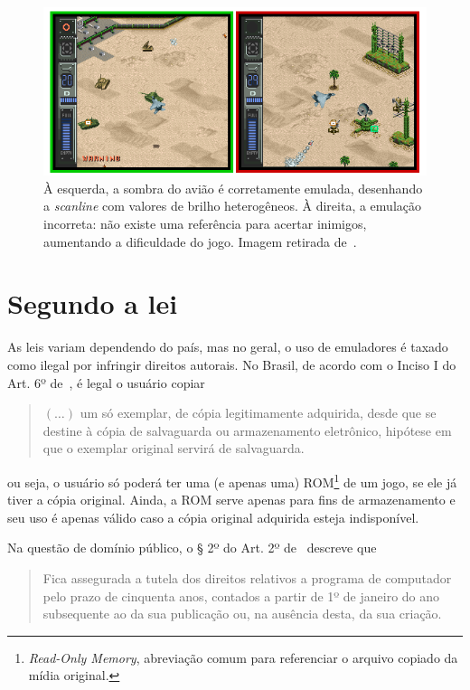 \documentclass[12pt]{sftex/sftex}
\begin{document}
\begin{figure}[ht]
\centering
\includegraphics[scale=0.70]{images/airforce}
\caption{À esquerda, a sombra do avião é corretamente emulada, desenhando a
\emph{scanline} com valores de brilho heterogêneos. À direita, a emulação
incorreta: não existe uma referência para acertar inimigos, aumentando a
dificuldade do jogo. Imagem retirada de~\cite{accpower}.}
\end{figure}

\section{Segundo a lei}

As leis variam dependendo do país, mas no geral, o uso de emuladores é taxado
como ilegal por infringir direitos autorais.  No Brasil, de acordo com o Inciso
I do Art. 6º de~\cite{lei9609}, é legal o usuário copiar

\begin{quote}
$(\ldots)$ um só exemplar, de cópia legitimamente adquirida, desde que se
destine à cópia de salvaguarda ou armazenamento eletrônico, hipótese em que
o exemplar original servirá de salvaguarda.
\end{quote}

ou seja, o usuário só poderá ter uma (e apenas uma) ROM\footnote{\emph{Read-Only
Memory}, abreviação comum para referenciar o arquivo copiado da mídia original.}
de um jogo, se ele já tiver a cópia original. Ainda, a ROM serve apenas para
fins de armazenamento e seu uso é apenas válido caso a cópia original adquirida
esteja indisponível.

Na questão de domínio público, o § 2º do Art. 2º de~\cite{lei9609} descreve que

\begin{quote}
Fica assegurada a tutela dos direitos relativos a programa de computador pelo
prazo de cinquenta anos, contados a partir de 1º de janeiro do ano subsequente
ao da sua publicação ou, na ausência desta, da sua criação.
\end{quote}
\end{document}
